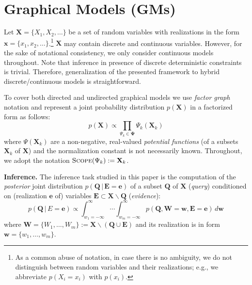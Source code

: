 \documentclass{article}
\renewcommand{\vec}[1]{\mathbf{#1}}
\newcommand{\bvec}[1]{\textbf{#1}}
\newcommand{\pr}{p}
\begin{document}

\section{Graphical Models (GMs)}
\label{sect:background}
Let $\vec{X} = \{X_1, X_2, \ldots\}$ be a set of random variables with realizations in the form 
$\vec{x} = \{x_1, x_2, \ldots\}$.\footnote{
As a common abuse of notation, in case there is no ambiguity, we do not distinguish between random variables and their realizations; e.g., we abbreviate $\pr(X_i = x_i)$ with $\pr(x_i)$.}
$\vec{X}$ may contain discrete and continuous variables. 
However, for the sake of notational consistency, %
we only consider continuous models throughout. 
Note that inference in presence of discrete deterministic constraints is trivial.
Therefore, generalization of the presented framework to hybrid discrete/continuous models is straightforward.   

To cover both directed and undirected graphical models we use
\emph{factor graph} notation \cite{kschischang2001factor}
and represent a joint probability distribution $\pr(\vec{X})$ in a factorized form as follows: 
\begin{equation}
\label{e:factor-graph}
\pr(\vec{X}) \propto \prod_{\Psi_k \in \boldsymbol\Psi} \Psi_k (\vec{X}_k)
\end{equation}
where 
$\Psi(\vec{X}_k)$ are a non-negative, real-valued \emph{potential functions} (of a subsets $\bvec{X}_k$ of $\vec{X}$) and the normalization constant is not necessarily known.
Throughout, we adopt the notation 
$\textsc{Scope}(\Psi_k) := \bvec{X}_k$.

\textbf{Inference.}
The inference task studied in this paper is 
the computation of the \emph{posterior} joint distribution 
$\pr(\bvec{Q} \,|\, \bvec{E}=\bvec{e})$
of 
a subset $\bvec{Q}$ of $\bvec{X}$ (\emph{query})
conditioned on (realization $\bvec{e}$ of) 
variables  
$\bvec{E} \subset\bvec{X} \backslash \bvec{Q}$ (\emph{evidence}):
\begin{equation}
\label{e:inference}
\pr(\vec{Q} \,|\, E =\vec{e}) \propto 
\int_{w_1 = -\infty}^{\infty} \!\!\!\!\!\! \cdots \int_{w_m = -\infty}^{\infty}
\!\!\!\!\!\!\!\! \pr(\bvec{Q}, \bvec{W} = \bvec{w}, \bvec{E}=\bvec{e} )
\, d \bvec{w}
\end{equation}
where $\bvec{W} = \{W_1, \ldots, W_m\} := \vec{X} \backslash (\vec{Q} \cup \vec{E})$ and its realization is in form $\bvec{w} = \{w_1, \ldots, w_m\}$.
\end{document}
